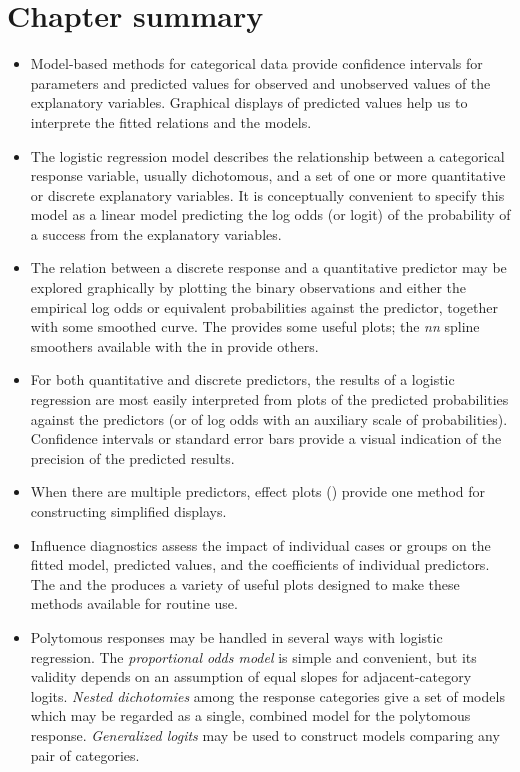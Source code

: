 \section{Chapter summary}
\begin{itemize}
\item Model-based methods for categorical data provide confidence intervals
for parameters and predicted values for observed and unobserved values
of the explanatory variables.  Graphical displays of predicted values
help us to interprete the fitted relations and the models.

\item The logistic regression model describes the relationship between 
a categorical response variable, usually dichotomous,
and a set of one or more quantitative or discrete explanatory variables.
It is conceptually
convenient to specify this model as a linear model predicting
the log odds (or logit) of the probability of a success 
from the explanatory variables.

\item The relation between a discrete response and a quantitative predictor
may be explored graphically by plotting the binary observations 
and either the empirical log odds or equivalent probabilities
against the predictor, together with some smoothed curve.
The  provides some useful plots;
the \emph{nn} spline smoothers available with the  in 
provide others.

\item For both quantitative and discrete predictors, the results of
a logistic regression are most easily interpreted from plots of
the predicted probabilities against the predictors
(or of log odds with an auxiliary scale of probabilities).
Confidence intervals or standard error bars provide a visual indication
of the precision of the predicted results.

\item When there are multiple predictors, effect plots () provide one method for constructing
simplified displays.

\item Influence diagnostics assess the impact of individual cases or
groups on the fitted model, predicted values, and the coefficients of individual predictors.  The  
and the  produces a variety of useful
plots designed to make these methods available for routine use.


\item Polytomous responses may be handled in several ways with
logistic regression.
The \emph{proportional odds model} is simple and convenient, but its validity
depends
on an assumption of equal slopes for adjacent-category logits.
\emph{Nested dichotomies} among the response categories give a set of models
which may be regarded as a single, combined model for the polytomous
response.
\emph{Generalized logits} may be used to construct models comparing
any pair of categories.


\end{itemize}

